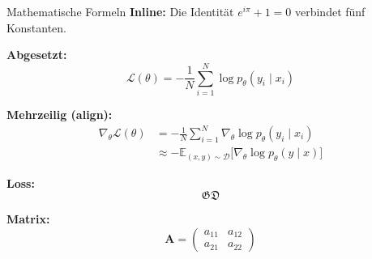 \begin{frame}{Mathematische Formeln}
  \textbf{Inline:} Die Identität $e^{i\pi} + 1 = 0$ verbindet fünf Konstanten.

  \vspace{0.6em}
  \textbf{Abgesetzt:}
  \[
    \mathcal{L}(\theta) = -\frac{1}{N}\sum_{i=1}^{N}
      \log p_\theta(y_i \mid x_i)
  \]

  \textbf{Mehrzeilig (align):}
  \begin{align*}
    \nabla_\theta \mathcal{L}(\theta)
      &= -\frac{1}{N}\sum_{i=1}^{N} \nabla_\theta \log p_\theta(y_i \mid x_i)\\
      &\approx -\mathbb{E}_{(x,y)\sim\mathcal{D}}\bigl[\nabla_\theta \log p_\theta(y\mid x)\bigr]
  \end{align*}

  \textbf{Loss:}
  \[
    \mathfrak{G} \mathfrak{D} 
  \]

  \textbf{Matrix:}
  \[
    \mathbf{A} = \begin{pmatrix} a_{11} & a_{12}\\ a_{21} & a_{22}\end{pmatrix}
  \]
\end{frame}